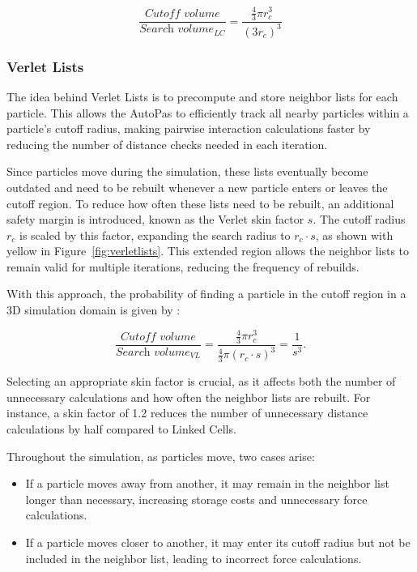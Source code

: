 \[
\frac{\textit{Cutoff volume}}{\textit{Search volume}_{LC}} =
\frac{\frac{4}{3} \pi r_c^3}{(3r_c)^3}
\]

\subsubsection{Verlet Lists} \label{sec:verletlists}

The idea behind Verlet Lists is to precompute and store neighbor lists for each particle. This allows the AutoPas to efficiently track all nearby particles within a particle's cutoff radius, making pairwise interaction calculations faster by reducing the number of distance checks needed in each iteration.

Since particles move during the simulation, these lists eventually become outdated and need to be rebuilt whenever a new particle enters or leaves the cutoff region. To reduce how often these lists need to be rebuilt, an additional safety margin is introduced, known as the Verlet skin factor \(s\). The cutoff radius \(r_c\) is scaled by this factor, expanding the search radius to \(r_c \cdot s\), as shown with yellow in Figure~\ref{fig:verletlists}. This extended region allows the neighbor lists to remain valid for multiple iterations, reducing the frequency of rebuilds.

With this approach, the probability of finding a particle in the cutoff region in a 3D simulation domain is given by \parencite{gratl2019autopas}:

\[
\frac{\textit{Cutoff volume}}{\textit{Search volume}_{VL}} =
\frac{\frac{4}{3} \pi r_c^3}{\frac{4}{3} \pi (r_c \cdot s)^3} =
\frac{1}{s^3}.
\]


Selecting an appropriate skin factor is crucial, as it affects both the number of unnecessary calculations and how often the neighbor lists are rebuilt. For instance, a skin factor of 1.2 reduces the number of unnecessary distance calculations by half compared to Linked Cells.

Throughout the simulation, as particles move, two cases arise:
\begin{itemize}
    \item If a particle moves away from another, it may remain in the neighbor list longer than necessary, increasing storage costs and unnecessary force calculations.
    \item If a particle moves closer to another, it may enter its cutoff radius but not be included in the neighbor list, leading to incorrect force calculations.
\end{itemize}

